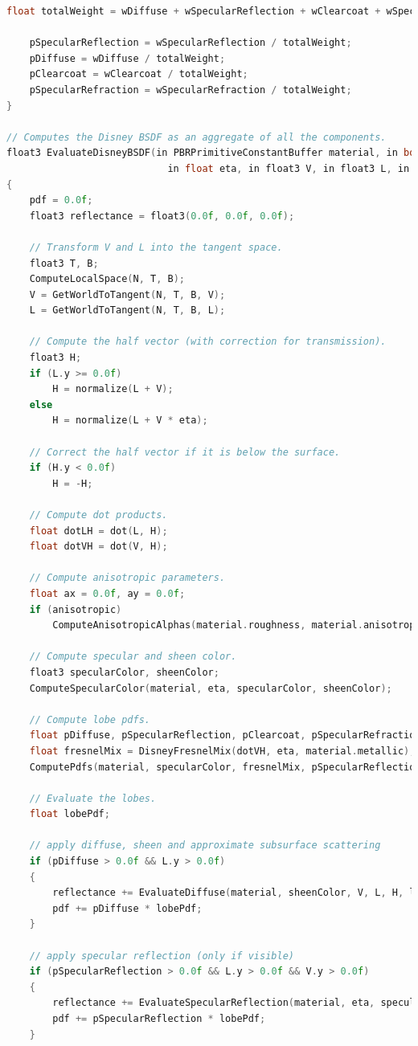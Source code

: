 \documentclass[12pt,a4paper]{report}
\numberwithin{equation}{section} %
\begin{document}
\begin{appendices}
\begin{lstlisting}[caption={Evaluarea și eșantionarea BSDF-ului Disney},label={lst:bsdf},language=C++,escapechar=\$]
	float totalWeight = wDiffuse + wSpecularReflection + wClearcoat + wSpecularRefraction;

	pSpecularReflection = wSpecularReflection / totalWeight;
	pDiffuse = wDiffuse / totalWeight;
	pClearcoat = wClearcoat / totalWeight;
	pSpecularRefraction = wSpecularRefraction / totalWeight;
}

// Computes the Disney BSDF as an aggregate of all the components.
float3 EvaluateDisneyBSDF(in PBRPrimitiveConstantBuffer material, in bool anisotropic,
							in float eta, in float3 V, in float3 L, in float3 N, out float pdf)
{
	pdf = 0.0f;
	float3 reflectance = float3(0.0f, 0.0f, 0.0f);

	// Transform V and L into the tangent space.
	float3 T, B;
	ComputeLocalSpace(N, T, B);
	V = GetWorldToTangent(N, T, B, V);
	L = GetWorldToTangent(N, T, B, L);

	// Compute the half vector (with correction for transmission).
	float3 H;
	if (L.y >= 0.0f)
		H = normalize(L + V);
	else
		H = normalize(L + V * eta);

	// Correct the half vector if it is below the surface.
	if (H.y < 0.0f)
		H = -H;

	// Compute dot products.
	float dotLH = dot(L, H);
	float dotVH = dot(V, H);

	// Compute anisotropic parameters.
	float ax = 0.0f, ay = 0.0f;
	if (anisotropic)
		ComputeAnisotropicAlphas(material.roughness, material.anisotropic, ax, ay);

	// Compute specular and sheen color.
	float3 specularColor, sheenColor;
	ComputeSpecularColor(material, eta, specularColor, sheenColor);

	// Compute lobe pdfs.
	float pDiffuse, pSpecularReflection, pClearcoat, pSpecularRefraction;
	float fresnelMix = DisneyFresnelMix(dotVH, eta, material.metallic);
	ComputePdfs(material, specularColor, fresnelMix, pSpecularReflection, pDiffuse, pClearcoat, pSpecularRefraction);

	// Evaluate the lobes.
	float lobePdf;

	// apply diffuse, sheen and approximate subsurface scattering
	if (pDiffuse > 0.0f && L.y > 0.0f)
	{
		reflectance += EvaluateDiffuse(material, sheenColor, V, L, H, lobePdf);
		pdf += pDiffuse * lobePdf;
	}

	// apply specular reflection (only if visible)
	if (pSpecularReflection > 0.0f && L.y > 0.0f && V.y > 0.0f)
	{
		reflectance += EvaluateSpecularReflection(material, eta, specularColor, V, L, H, anisotropic, ax, ay, lobePdf);
		pdf += pSpecularReflection * lobePdf;
	}


\end{lstlisting}
\end{appendices}
\end{document}
